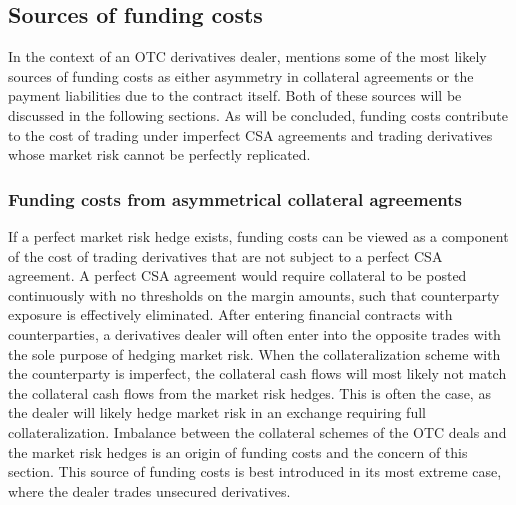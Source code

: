 \documentclass[main.tex]{subfiles}
\begin{document}
    \subsection{Sources of funding costs}
        In the context of an OTC derivatives dealer, 
        \textcite{Ruiz2013FVA} mentions some of the most likely sources of funding costs as
        either asymmetry in collateral agreements or the payment liabilities due to the contract itself.
        Both of these sources will be discussed in the following sections.
        As will be concluded, funding costs contribute to the cost of trading under imperfect CSA agreements 
        and trading derivatives whose market risk cannot be perfectly replicated.

    \subsubsection{Funding costs from asymmetrical collateral agreements}
        If a perfect market risk hedge exists, funding costs can be viewed 
        as a component of the cost of trading derivatives that are not subject to a perfect CSA agreement.
        A perfect CSA agreement would require collateral to be posted continuously with no thresholds on the margin amounts,
        such that counterparty exposure is effectively eliminated.
        After entering financial contracts with counterparties,
        a derivatives dealer will often enter into the opposite trades
        with the sole purpose of hedging market risk.
        When the collateralization scheme with the counterparty is imperfect, 
        the collateral cash flows will most likely not match the collateral cash flows from the market risk hedges.
        This is often the case, as the dealer will likely hedge market risk in an exchange requiring full collateralization.
        Imbalance between the collateral schemes of the OTC deals and the market risk hedges
        is an origin of funding costs and the concern of this section.
        This source of funding costs is best introduced in its most extreme case, 
        where the dealer trades unsecured derivatives. 
\end{document}
